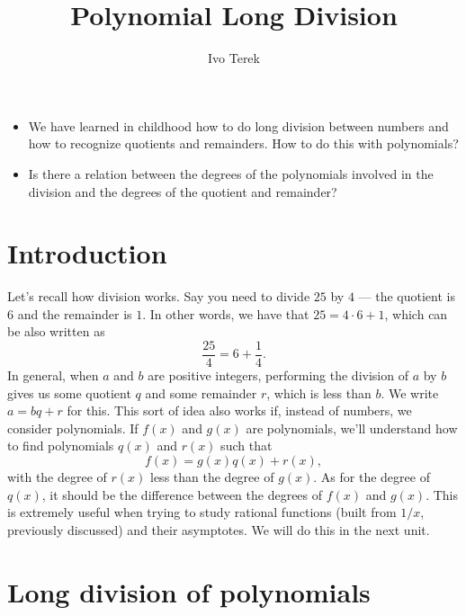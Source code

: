 \documentclass{ximera}
\author{Ivo Terek}
\title{Polynomial Long Division}
\begin{document}
\begin{abstract}
\end{abstract}
\maketitle


\begin{motivatingQuestions}\begin{itemize}
\item We have learned in childhood how to do long division between numbers and how to recognize quotients and remainders. How to do this with polynomials?
\item Is there a relation between the degrees of the polynomials involved in the division and the degrees of the quotient and remainder?
\end{itemize}\end{motivatingQuestions}



\section{Introduction}

Let's recall how division works. Say you need to divide $25$ by $4$ --- the quotient is $6$ and the remainder is $1$. In other words, we have that $25 = 4\cdot 6 + 1$, which can be also written as $$  \frac{25}{4} = 6+\frac{1}{4}. $$In general, when $a$ and $b$ are positive integers, performing the division of $a$ by $b$ gives us some quotient $q$ and some remainder $r$, which is less than $b$. We write $a = bq+r$ for this. This sort of idea also works if, instead of numbers, we consider polynomials. If $f(x)$ and $g(x)$ are polynomials, we'll understand how to find polynomials $q(x)$ and $r(x)$ such that $$  f(x) = g(x)q(x)+r(x),  $$with the degree of $r(x)$ less than the degree of $g(x)$. As for the degree of $q(x)$, it should be the difference between the degrees of $f(x)$ and $g(x)$. This is extremely useful when trying to study rational functions (built from $1/x$, previously discussed) and their asymptotes. We will do this in the next unit.

\section{Long division of polynomials}
\end{document}
